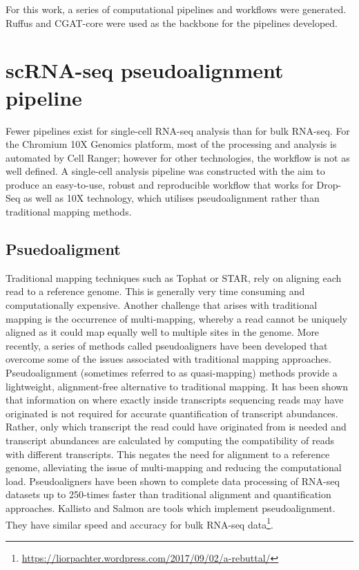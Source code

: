 For this work, a series of computational pipelines and workflows were generated.
Ruffus and CGAT-core\cite{cribbs2019cgat} were used as the backbone for the pipelines developed.

\section{scRNA-seq pseudoalignment pipeline}\label{sec:scRNA_pipeline}
Fewer pipelines exist for single-cell RNA-seq analysis than for bulk RNA-seq.
For the Chromium 10X Genomics platform, most of the processing and analysis is automated by Cell Ranger;
however for other technologies, the workflow is not as well defined.
A single-cell analysis pipeline was constructed with the aim to produce an easy-to-use, robust and reproducible workflow that works for Drop-Seq as well as 10X technology, which utilises pseudoalignment rather than traditional mapping methods.

\subsection{Psuedoaligment}
Traditional mapping techniques such as Tophat\cite{trapnell2009tophat} or STAR\cite{dobin2013star}, rely on aligning each read to a reference genome.
This is generally very time consuming and computationally expensive.
Another challenge that arises with traditional mapping is the occurrence of multi-mapping, whereby a read cannot be uniquely aligned as it could map equally well to multiple sites in the genome\cite{mortazavi2008mapping}.
More recently, a series of methods called pseudoaligners have been developed that overcome some of the issues associated with traditional mapping approaches.
Pseudoalignment (sometimes referred to as quasi-mapping) methods provide a lightweight, alignment-free alternative to traditional mapping.
It has been shown that information on where exactly inside transcripts sequencing reads may have originated is not required for accurate quantification of transcript abundances\cite{nicolae2010estimation}.
Rather, only which transcript the read could have originated from is needed and transcript abundances are calculated by computing the compatibility of reads with different transcripts.
This negates the need for alignment to a reference genome, alleviating the issue of multi-mapping and reducing the computational load.
Pseudoaligners have been shown to complete data processing of RNA-seq datasets up to 250-times faster than traditional alignment and quantification approaches\cite{bray2016near}.
Kallisto\cite{bray2016near} and Salmon\cite{patro2017salmon} are tools which implement pseudoalignment.
They have similar speed and accuracy for bulk RNA-seq data\footnote{\url{https://liorpachter.wordpress.com/2017/09/02/a-rebuttal/}}.


